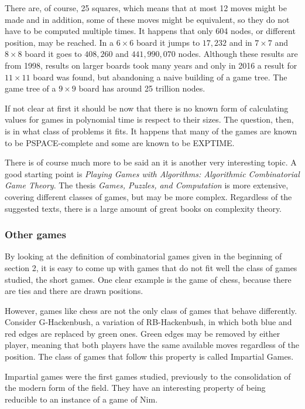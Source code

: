 There are, of course, 25 squares, which means that at most 12 moves might be made and in addition, some of these moves might be equivalent, so they do not have to be computed multiple times. It happens that only 604 nodes, or different position, may be reached\cite{1}. In a $6\times 6$ board it jumps to $17,232$ and in $7\times 7$ and $8\times 8$ board it goes to $408,260$ and $441,990,070$ nodes. Although these results are from 1998, results on larger boards took many years and only in 2016 a result for $11 \times 11$\cite{2} board was found, but abandoning a naive building of a game tree. The game tree of a $9\times 9$ board has around 25 trillion nodes.

If not clear at first it should be now that there is no known form of calculating values for games in polynomial time is respect to their sizes. The question, then, is in what class of problems it fits. It happens that many of the games are known to be PSPACE-complete and some are known to be EXPTIME.

There is of course much more to be said an it is another very interesting topic. A good starting point is \textit{Playing Games with Algorithms: Algorithmic Combinatorial Game Theory}\cite{3}. The thesis \textit{Games, Puzzles, and Computation} is more extensive, covering different classes of games, but may be more complex. Regardless of the suggested texts, there is a large amount of great books on complexity theory.

\subsubsection*{Other games}

By looking at the definition of combinatorial games given in the beginning of section 2, it is easy to come up with games that do not fit well the class of games studied, the short games. One clear example is the game of chess, because there are ties and there are drawn positions.

However, games like chess are not the only class of games that behave differently. Consider G-Hackenbush, a variation of RB-Hackenbush, in which both blue and red edges are replaced by green ones. Green edges may be removed by either player, meaning that both players have the same available moves regardless of the position. The class of games that follow this property is called Impartial Games.

Impartial games were the first games studied, previously to the consolidation of the modern form of the field. They have an interesting property of being reducible to an instance of a game of Nim. 


